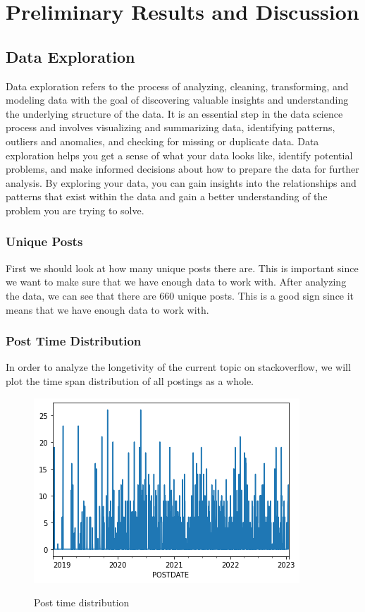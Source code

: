 \chapter{Preliminary Results and Discussion}

\section{Data Exploration} \label{data-exploration} 
Data exploration refers to the process of analyzing, cleaning, transforming, and modeling data with the goal of discovering valuable insights and understanding the underlying structure of the data. It is an essential step in the data science process and involves visualizing and summarizing data, identifying patterns, outliers and anomalies, and checking for missing or duplicate data. Data exploration helps you get a sense of what your data looks like, identify potential problems, and make informed decisions about how to prepare the data for further analysis. By exploring your data, you can gain insights into the relationships and patterns that exist within the data and gain a better understanding of the problem you are trying to solve.

\subsection{Unique Posts} \label{unique-posts}
First we should look at how many unique posts there are. This is important since we want to make sure that we have enough data to work with. After analyzing the data, we can see that there are 660 unique posts. This is a good sign since it means that we have enough data to work with.

\subsection{Post Time Distribution} \label{post-time}
In order to analyze the longetivity of the current topic on stackoverflow, we will plot the time span distribution of all postings as a whole.
\begin{figure}[H]
  \centering
  \noindent  \includegraphics[scale=1]{post-time-distri.png}\\
\caption{Post time distribution}\label{fig:post-time}
\end{figure}

